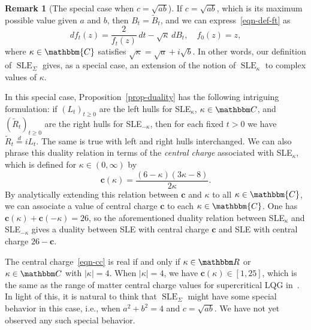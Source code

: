 \documentclass[11pt]{article}
\theoremstyle{plain}
\theoremstyle{definition}
\newtheorem{remark}[thm]{Remark}
\numberwithin{equation}{section}
\newcommand{\eqb}{\begin{equation}}
\newcommand{\eqe}{\end{equation}}
\newcommand{\BB}{\mathbbm}
\newcommand{\eqD}{\overset{d}{=}}
\newcommand{\wt}{\widetilde}
\newcommand{\SLE}{{\operatorname{SLE}}_\kappa}
\newcommand{\SLEG}{{\operatorname{SLE}}_\Sigma}
\newcommand{\cc}{{\mathbf{c}}}
\begin{document}
\begin{remark}[The special case when $c = \sqrt{ab}$]
\label{remark-duality}
If $c = \sqrt{ab}$, which is its maximum possible value given $a$ and $b$, then $B_t = \wt B_t$, and we can express~\eqref{eqn-def-ft} as
\eqb
\label{eqn-sle-kappa-def}
df_t(z) = \frac{2}{f_t(z)} \,  dt  - \sqrt{\kappa}  \, d B_t, \quad f_0(z) = z ,
\eqe
where $\kappa \in \BB{C}$ satisfies $\sqrt{\kappa} = \sqrt{a} + i \sqrt{b}$. In other words, our definition of $\SLEG$ gives, as a special case, an extension of the notion of $\SLE$ to complex values of $\kappa$. 

In this special case, Proposition~\ref{prop-duality} has the following intriguing formulation: if $(L_t)_{t\geq 0}$ are the left hulls for SLE$_\kappa$, $\kappa\in\BB C$, and $(\wt R_t)_{t\geq 0}$ are the right hulls for SLE$_{-\kappa}$, then for each fixed $t>0$ we have $\wt R_t \eqD i L_t$. The same is true with left and right hulls interchanged.
We can also phrase this duality relation in terms of the \emph{central charge} associated with SLE$_\kappa$, which is defined for $\kappa \in (0,\infty)$ by
\eqb \label{eqn-cc}
\cc(\kappa) = \frac{(6-\kappa) (3\kappa-8)}{2\kappa} .
\eqe
By analytically extending this relation between $\cc$ and $\kappa$ to all $\kappa \in \BB{C}$, we can associate a value of central charge $\cc$ to each $\kappa \in \BB{C}$.
One has $\cc(\kappa) + \cc(-\kappa) = 26$, so the aforementioned duality relation between SLE$_\kappa$ and SLE$_{-\kappa}$ gives a duality between SLE with central charge $\cc$ and SLE with central charge $26-\cc$. 

The central charge~\eqref{eqn-cc} is real if and only if $\kappa \in \BB R$ or $\kappa \in \BB C$ with $|\kappa| = 4$. When $|\kappa| = 4$, we have $\cc(\kappa) \in [1,25]$, which is the same as the range of matter central charge values for supercritical LQG in~\cite{dg-supercritical-lfpp,pfeffer-supercritical-lqg,dg-confluence,dg-uniqueness}. In light of this, it is natural to think that $\SLEG$ might have some special behavior in this case, i.e., when $a^2 + b^2 = 4$ and $c = \sqrt{ab}$. We have not yet observed any such special behavior.
\end{remark}
\end{document}
